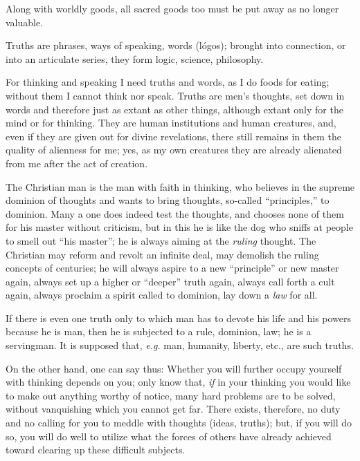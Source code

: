 \documentclass[12pt,a4paper]{book}
\begin{document}
Along with worldly goods, all sacred goods too must be put away as no longer 
valuable.

Truths are phrases, ways of speaking, words (l\'ogos); brought into 
connection, or into an articulate series, they form logic, science, 
philosophy.

For thinking and speaking I need truths and words, as I do foods for eating; 
without them I cannot think nor speak. Truths are men's thoughts, set down in 
words and therefore just as extant as other things, although extant only for 
the mind or for thinking. They are human institutions and human creatures, 
and, even if they are given out for divine revelations, there still remains in 
them the quality of alienness for me; yes, as my own creatures they are 
already alienated from me after the act of creation.

The Christian man is the man with faith in thinking, who believes in the 
supreme dominion of thoughts and wants to bring thoughts, so-called 
``principles,'' to dominion. Many a one does indeed test the thoughts, and 
chooses none of them for his master without criticism, but in this he is like 
the dog who sniffs at people to smell out ``his master''; he is always 
aiming at the \textit{ruling} thought. The Christian may reform and revolt an 
infinite deal, may demolish the ruling concepts of centuries; he will always 
aspire to a new ``principle'' or new master again, always set up a higher or 
``deeper'' truth again, always call forth a cult again, always proclaim a 
spirit called to dominion, lay down a \textit{law} for all.

If there is even one truth only to which man has to devote his life and his 
powers because he is man, then he is subjected to a rule, dominion, law; he is 
a servingman. It is supposed that, \textit{e.g.} man, humanity, liberty, 
etc., are such truths.

On the other hand, one can say thus: Whether you will further occupy yourself 
with thinking depends on you; only know that, \textit{if} in your thinking you 
would like to make out anything worthy of notice, many hard problems are to be 
solved, without vanquishing which you cannot get far. There exists, therefore, 
no duty and no calling for you to meddle with thoughts (ideas, truths); but, 
if you will do so, you will do well to utilize what the forces of others have 
already achieved toward clearing up these difficult subjects.
\end{document}
